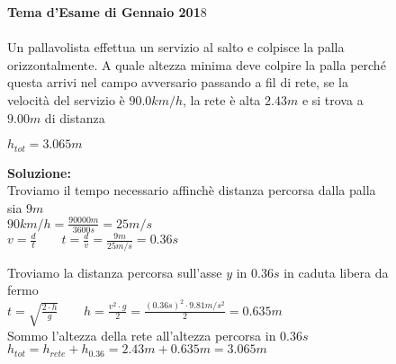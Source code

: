 \begin{figure}[h!]
\textbf{Tema d'Esame di Gennaio 201}8\\ \\
Un pallavolista effettua un servizio al salto e colpisce la palla orizzontalmente. A
quale altezza minima deve colpire la palla perché questa arrivi nel campo
avversario passando a fil di rete, se la velocità del servizio è $90.0 km/h$, la rete è
alta $2.43 m$ e si trova a $9.00 m$ di distanza\\ 
\begin{boxed}

\null\hfill $h_{tot} = 3.065m$

\textbf{Soluzione:}\\
Troviamo il tempo necessario affinchè distanza percorsa dalla palla sia $9m$\\
$90km/h=\frac{90000m}{3600s}=25m/s$  \\
$v=\frac{d}{t} \qquad t=\frac{d}{v}=\frac{9m}{25m/s}=0.36s$

Troviamo la distanza percorsa sull'asse $y$ in $0.36s$ in caduta libera da fermo\\
$t=\sqrt{\frac{2\cdot h}{g}} \qquad h=\frac{v^2\cdot g}{2}= \frac{(0.36s)^2\cdot 9.81m/s^2}{2}=0.635m$\\

Sommo l'altezza della rete all'altezza percorsa in $0.36s$ \\
$h_{tot}=h_{rete} + h_{0.36} = 2.43m + 0.635m =3.065m$

\end{boxed}
\end{figure}

